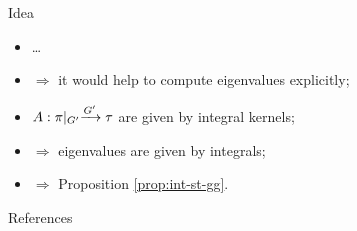 \documentclass[pdf,notes]{beamer}
\renewcommand{\implies}{\Rightarrow}
\begin{document}
\begin{frame}{Idea}
	\begin{itemize}%
		\item \ldots
		\item $\implies$ it would help to compute eigenvalues explicitly;
		\item $\mysbo$ are given by integral kernels; 
		\item $\implies$ eigenvalues are given by integrals;
		\item $\implies$ Proposition \ref{prop:int-st-gg}.
	\end{itemize}
\end{frame}
\begin{frame}[allowframebreaks]{References}
	
	\nocite{Selberg:411367}
	\nocite{warnaar2010sl3}
	\nocite{dotsenko1985four}
	\nocite{tarasov2003selberg}

\end{frame}
\end{document}
